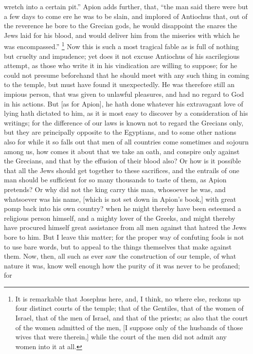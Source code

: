 wretch into a certain pit.'' Apion adds further, that, ``the man said there
were but a few days to come ere he was to be slain, and implored of
Antiochus that, out of the reverence he bore to the Grecian gods, he would
disappoint the snares the Jews laid for his blood, and would deliver him
from the miseries with which he was encompassed.'' \footnote{It is remarkable that
Josephus here, and, I think, no where else, reckons up four distinct
courts of the temple; that of the Gentiles, that of the women of Israel,
that of the men of Israel, and that of the priests; as also that the court
of the women admitted of the men, [I suppose only of the husbands of those
wives that were therein,] while the court of the men did not admit any
women into it at all.} Now this
is such a most tragical fable as is full of nothing but cruelty and
impudence; yet does it not excuse Antiochus of his sacrilegious attempt,
as those who write it in his vindication are willing to suppose; for he
could not presume beforehand that he should meet with any such thing in
coming to the temple, but must have found it unexpectedly. He was
therefore still an impious person, that was given to unlawful pleasures,
and had no regard to God in his actions. But [as for Apion], he hath done
whatever his extravagant love of lying hath dictated to him, as it is most
easy to discover by a consideration of his writings; for the difference of
our laws is known not to regard the Grecians only, but they are
principally opposite to the Egyptians, and to some other nations also for
while it so falls out that men of all countries come sometimes and sojourn
among us, how comes it about that we take an oath, and conspire only
against the Grecians, and that by the effusion of their blood also? Or how
is it possible that all the Jews should get together to these sacrifices,
and the entrails of one man should be sufficient for so many thousands to
taste of them, as Apion pretends? Or why did not the king carry this man,
whosoever he was, and whatsoever was his name, [which is not set down in
Apion's book,] with great pomp back into his own country? when he might
thereby have been esteemed a religious person himself, and a mighty lover
of the Greeks, and might thereby have procured himself great assistance
from all men against that hatred the Jews bore to him. But I leave this
matter; for the proper way of confuting fools is not to use bare words,
but to appeal to the things themselves that make against them. Now, then,
all such as ever saw the construction of our temple, of what nature it
was, know well enough how the purity of it was never to be profaned; for
